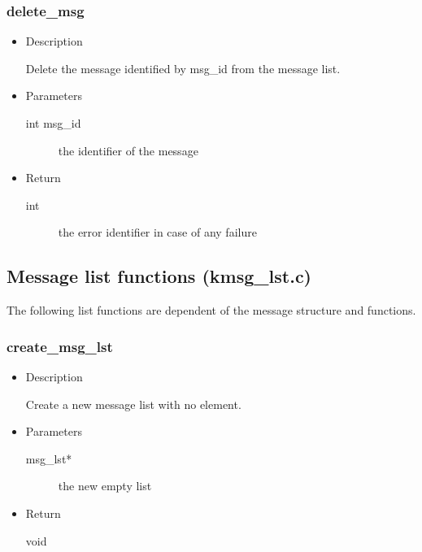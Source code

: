 \subsubsection{delete\_msg}
\begin{itemize}
\item{Description}

	Delete the message identified by msg\_id from the message list.
\item{Parameters}
	\begin{description}
	\item[int msg\_id] the identifier of the message
	\end{description}
\item{Return}
	\begin{description}
	\item[int] the error identifier in case of any failure
	\end{description}
\end{itemize}


\subsection{Message list functions (kmsg\_lst.c)}

The following list functions are dependent of the message structure and functions.

\subsubsection{create\_msg\_lst}
\begin{itemize}
\item{Description}

	Create a new message list with no element.
\item{Parameters}
	\begin{description}
	\item[msg\_lst*] the new empty list
	\end{description}
\item{Return}
	\begin{description}
	\item[void]
	\end{description}
\end{itemize}

